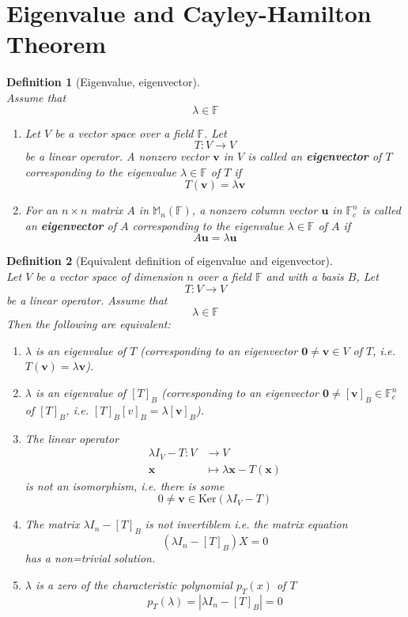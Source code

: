 \documentclass[12pt]{article}
\newcommand{\kerne}{\mathrm{Ker}}
\newtheorem{definition}{Definition}[section]
\theoremstyle{definition}
\begin{document}
\section{Eigenvalue and Cayley-Hamilton Theorem}
\begin{definition}[Eigenvalue, eigenvector]
\hfill\\\normalfont Assume that
\[
\lambda\in\mathbb{F}
\]
\begin{enumerate}[label=(arabic*)]
\item Let $V$ be a vector space over a field $\mathbb{F}$. Let
\[
T:V\to V
\]
be a linear operator. A \textit{nonzero} vector $\mathbf{v}$ in $V$ is called an \textbf{eigenvector} of $T$ corresponding to the eigenvalue $\lambda\in\mathbb{F}$ of $T$ if
\[
T(\mathbf{v})=\lambda\mathbf{v}
\]
\item For an $n\times n$ matrix $A$ in $\mathbb{M}_n(\mathbb{F})$, a nonzero column vector $\mathbf{u}$ in $\mathbb{F}^n_c$ is called an \textbf{eigenvector} of $A$ corresponding to the eigenvalue $\lambda\in\mathbb{F}$ of $A$ if
\[
A\mathbf{u}=\lambda\mathbf{u}
\]
\end{enumerate}
\end{definition}
\begin{definition}[Equivalent definition of eigenvalue and eigenvector]
\hfill\\\normalfont Let $V$ be a vector space of dimension $n$ over a field $\mathbb{F}$ and with a basis $B$, Let
\[
T:V\to V
\]
be a linear operator. Assume that
\[
\lambda\in\mathbb{F}
\]
Then the following are equivalent:
\begin{enumerate}[label=(\arabic*)]
\item $\lambda$ is an eigenvalue of $T$ (corresponding to an eigenvector $\mathbf{0}\neq\mathbf{v}\in V$ of $T$, i.e. $T(\mathbf{v})=\lambda \mathbf{v}$).
\item $\lambda$ is an eigenvalue of $[T]_B$ (corresponding to an eigenvector $\mathbf{0}\neq[\mathbf{v}]_B\in\mathbb{F}^n_c$ of $[T]_B$, i.e. $[T]_B[v]_B =\lambda[\mathbf{v}]_B$).
\item The linear operator
\[
\begin{aligned}
\lambda I_V-T:V&\to V\\
\mathbf{x}&\mapsto \lambda \mathbf{x}-T(\mathbf{x})
\end{aligned}
\]
is not an isomorphism, i.e. there is some 
\[
0\neq \mathbf{v}\in\kerne(\lambda I_V-T)
\]
\item The matrix $\lambda I_n-[T]_B$ is not invertiblem i.e. the matrix equation
\[
(\lambda I_n-[T]_B)X=0
\]
has a non=trivial solution.
\item $\lambda$ is a zero of the characteristic polynomial $p_T(x)$ of $T$
\[
p_T(\lambda)=|\lambda I_n-[T]_B|=0
\]
\end{enumerate}
\end{definition}
\end{document}
